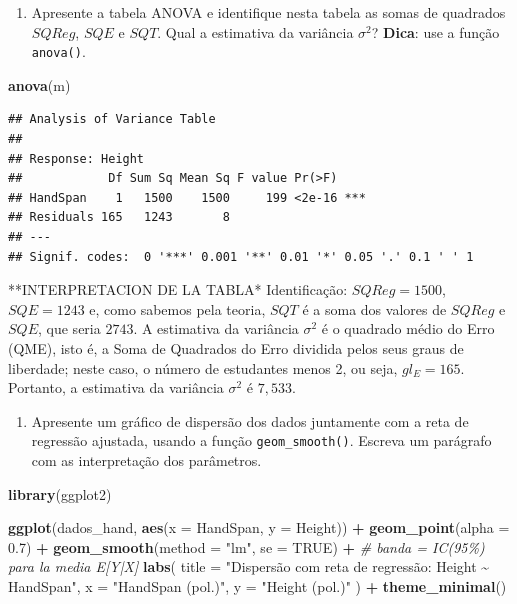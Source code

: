 \documentclass[
]{article}
\newenvironment{Shaded}{\begin{snugshade}}{\end{snugshade}}
\newcommand{\AttributeTok}[1]{\textcolor[rgb]{0.13,0.29,0.53}{#1}}
\newcommand{\CommentTok}[1]{\textcolor[rgb]{0.56,0.35,0.01}{\textit{#1}}}
\newcommand{\ConstantTok}[1]{\textcolor[rgb]{0.56,0.35,0.01}{#1}}
\newcommand{\FloatTok}[1]{\textcolor[rgb]{0.00,0.00,0.81}{#1}}
\newcommand{\FunctionTok}[1]{\textcolor[rgb]{0.13,0.29,0.53}{\textbf{#1}}}
\newcommand{\NormalTok}[1]{#1}
\newcommand{\SpecialCharTok}[1]{\textcolor[rgb]{0.81,0.36,0.00}{\textbf{#1}}}
\newcommand{\StringTok}[1]{\textcolor[rgb]{0.31,0.60,0.02}{#1}}
\providecommand{\tightlist}{%
  \setlength{\itemsep}{0pt}\setlength{\parskip}{0pt}}
\begin{document}
\begin{enumerate}
\def\labelenumi{\arabic{enumi}.}
\setcounter{enumi}{2}
\tightlist
\item
  Apresente a tabela ANOVA e identifique nesta tabela as somas de
  quadrados \(SQReg\), \(SQE\) e \(SQT\). Qual a estimativa da variância
  \(\sigma^2\)? \textbf{Dica}: use a função \texttt{anova()}.
\end{enumerate}

\begin{Shaded}
\begin{Highlighting}[]
\FunctionTok{anova}\NormalTok{(m)}
\end{Highlighting}
\end{Shaded}

\begin{verbatim}
## Analysis of Variance Table
## 
## Response: Height
##            Df Sum Sq Mean Sq F value Pr(>F)    
## HandSpan    1   1500    1500     199 <2e-16 ***
## Residuals 165   1243       8                   
## ---
## Signif. codes:  0 '***' 0.001 '**' 0.01 '*' 0.05 '.' 0.1 ' ' 1
\end{verbatim}

**INTERPRETACION DE LA TABLA* Identificação: \(SQReg = 1500\),
\(SQE = 1243\) e, como sabemos pela teoria, \(SQT\) é a soma dos valores
de \(SQReg\) e \(SQE\), que seria \(2743\). A estimativa da variância
\(\sigma^2\) é o quadrado médio do Erro (QME), isto é, a Soma de
Quadrados do Erro dividida pelos seus graus de liberdade; neste caso, o
número de estudantes menos 2, ou seja, \(gl_E = 165\). Portanto, a
estimativa da variância \(\sigma^2\) é \(7{,}533\).

\begin{enumerate}
\def\labelenumi{\arabic{enumi}.}
\setcounter{enumi}{3}
\tightlist
\item
  Apresente um gráfico de dispersão dos dados juntamente com a reta de
  regressão ajustada, usando a função \texttt{geom\_smooth()}. Escreva
  um parágrafo com as interpretação dos parâmetros.
\end{enumerate}

\begin{Shaded}
\begin{Highlighting}[]
\FunctionTok{library}\NormalTok{(ggplot2)}

\FunctionTok{ggplot}\NormalTok{(dados\_hand, }\FunctionTok{aes}\NormalTok{(}\AttributeTok{x =}\NormalTok{ HandSpan, }\AttributeTok{y =}\NormalTok{ Height)) }\SpecialCharTok{+}
  \FunctionTok{geom\_point}\NormalTok{(}\AttributeTok{alpha =} \FloatTok{0.7}\NormalTok{) }\SpecialCharTok{+}
  \FunctionTok{geom\_smooth}\NormalTok{(}\AttributeTok{method =} \StringTok{"lm"}\NormalTok{, }\AttributeTok{se =} \ConstantTok{TRUE}\NormalTok{) }\SpecialCharTok{+}  \CommentTok{\# banda = IC(95\%) para la media E[Y|X]}
  \FunctionTok{labs}\NormalTok{(}
    \AttributeTok{title =} \StringTok{"Dispersão com reta de regressão: Height \textasciitilde{} HandSpan"}\NormalTok{,}
    \AttributeTok{x =} \StringTok{"HandSpan (pol.)"}\NormalTok{,}
    \AttributeTok{y =} \StringTok{"Height (pol.)"}
\NormalTok{  ) }\SpecialCharTok{+}
  \FunctionTok{theme\_minimal}\NormalTok{()}
\end{Highlighting}
\end{Shaded}
\end{document}

